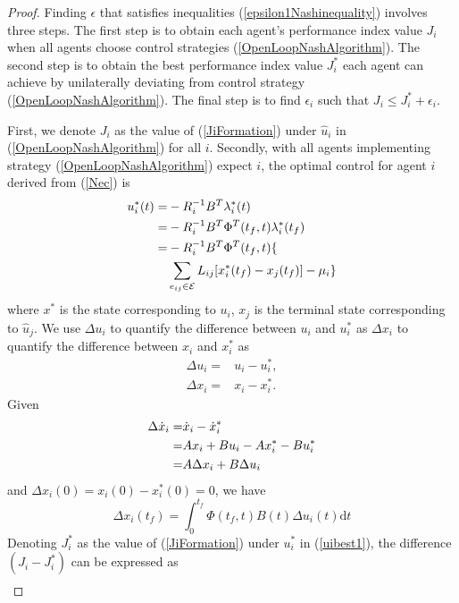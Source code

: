 \documentclass[10pt,doublecolumn]{IEEEtran}  %
\begin{document}
\begin{proof}
Finding $\epsilon$ that satisfies inequalities (\ref{epsilon1Nashinequality}) involves three steps. The first step is to obtain each agent's performance index value $J_i$ when all agents choose control strategies (\ref{OpenLoopNashAlgorithm}). The second step is to obtain the best performance index value $J_i^*$ each agent can achieve by unilaterally deviating from control strategy (\ref{OpenLoopNashAlgorithm}). The final step is to find $\epsilon_i$ such that $J_i\leq J_i^*+\epsilon_i$.

First, we denote $J_i$ as the value of (\ref{JiFormation}) under $\hat{u}_i$ in (\ref{OpenLoopNashAlgorithm}) for all $i$. Secondly, with all agents implementing strategy (\ref{OpenLoopNashAlgorithm}) expect $i$, the optimal control for agent $i$ derived from  (\ref{Nec}) is
\begin{align}
u^*_i(t)=&-R_i^{-1}B^T\lambda^*_i(t)\notag\\
=&-R_i^{-1}B^T\Phi^T(t_f,t)\lambda^*_i(t_f)\notag\\
=&-R_i^{-1}B^T\Phi^T(t_f,t)\{\notag\\
&\sum_{e_{ij}\in\mathcal{E}} L_{ij}[x^*_i(t_f)-x_j(t_f)]-\mu_i\} \label{uibest1}
\end{align}
where $x^*$ is the state corresponding to $u_i$, $x_j$ is the terminal state corresponding to $\hat{u}_j$. We use $\Delta u_i$ to quantify the difference between $u_i$ and $u^*_i$ as $\Delta x_i$ to quantify the difference between $x_i$ and $x^*_i$ as 
\begin{align*}
\Delta u_i=&u_i-u_i^*,\\
\Delta x_i=&x_i - x_i^*.
\end{align*} 
Given
\begin{align}
\Delta\dot{x}_i=&\dot{x}_i-\dot{x}_i^*\notag\\
=&Ax_i+Bu_i-Ax_i^*-Bu^*_i\notag\\
=&A\Delta x_i+ B\Delta u_i\notag
\end{align}
and $\Delta x_i(0)=x_i(0)-x^*_i(0)=0$,  we have
\begin{equation}
\Delta x_i(t_f)=\int^{t_f}_0\Phi(t_f,t)B(t)\Delta u_i(t)\mbox{d}t\label{Deltaxi}
\end{equation}
Denoting $J^*_i$ as the value of (\ref{JiFormation}) under $u^*_i$ in (\ref{uibest1}), the difference $(J_i-J_i^*)$ can be expressed as
\begin{align}

\end{align}
\end{proof}
\end{document}
